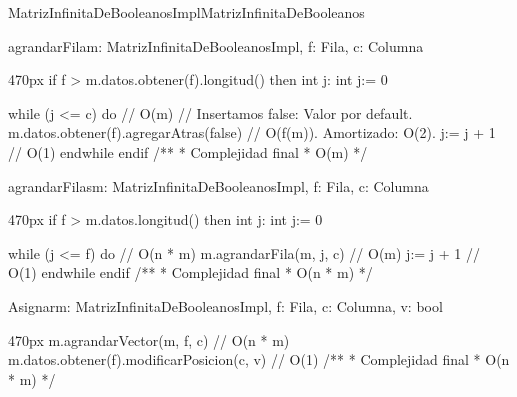 \documentclass[10pt,a4paper]{article}
\begin{document}
\vspace{1em}
\vspace{1em}
\begin{ModuloImplements}{MatrizInfinitaDeBooleanosImpl}{MatrizInfinitaDeBooleanos}
  \begin{Vars}
  \end{Vars}

  \begin{proc}{agrandarFila}{\Inout m: MatrizInfinitaDeBooleanosImpl, \In f: Fila, \In c: Columna}{}
    \begin{ImplementationCode}{470px}
      if f > m.datos.obtener(f).longitud() then
        int j: int
            j:= 0
        
        while (j <= c) do // O(m)
          // Insertamos false: Valor por default.
          m.datos.obtener(f).agregarAtras(false) // O(f(m)). Amortizado: O(2).
          j:= j + 1 // O(1)
        endwhile
      endif
      /**
       * Complejidad final
       * O(m)
       */
    \end{ImplementationCode}
  \end{proc}

  \begin{proc}{agrandarFilas}{\Inout m: MatrizInfinitaDeBooleanosImpl, \In f: Fila, \In c: Columna}{}
    \begin{ImplementationCode}{470px}
      if f > m.datos.longitud() then
        int j: int
            j:= 0
        
        while (j <= f) do         // O(n * m)
          m.agrandarFila(m, j, c) // O(m)
          j:= j + 1 // O(1)
        endwhile
      endif
      /**
       * Complejidad final
       * O(n * m)
       */
    \end{ImplementationCode}
  \end{proc}


  \begin{proc}{Asignar}{\Inout m: MatrizInfinitaDeBooleanosImpl, \In f: Fila, \In c: Columna, \In v: bool}{}
    \begin{ImplementationCode}{470px}
      m.agrandarVector(m, f, c)                    // O(n * m)
      m.datos.obtener(f).modificarPosicion(c, v) // O(1)
      /**
       * Complejidad final
       * O(n * m)
       */
    \end{ImplementationCode}
  \end{proc}


\end{ModuloImplements}
\end{document}
